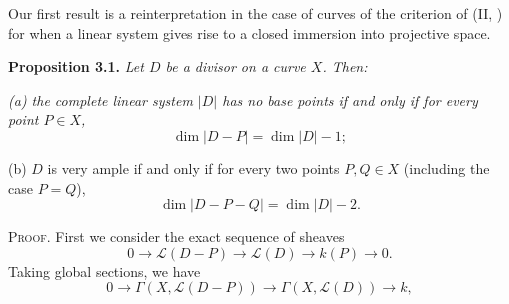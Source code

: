 {Our first result is a reinterpretation in the case of curves of the criterion of (II, ) for when a linear system gives rise to a closed immersion into projective space.

\medskip
\noindent\hypertarget{result-IV-3.1}{}\textbf{Proposition 3.1.} \emph{Let $D$ be a divisor on a curve $X$. Then:}
\par{\itshape\leftskip=12pt
\hypertarget{result-IV-3.1a}{}(a) the complete linear system $|D|$ has no base points if and only if for every point $P\in X$,
\[
\dim|D-P|=\dim|D|-1;
\]

\hypertarget{result-IV-3.1b}{}(b) $D$ is very ample if and only if for every two points $P,Q\in X$ (including the case $P=Q$),
\[
\dim|D-P-Q|=\dim|D|-2.
\]\par}

\smallskip
\noindent\textsc{Proof.} First we consider the exact sequence of sheaves
\[
0\to\mathcal L(D-P)\to\mathcal L(D)\to k(P)\to0.
\]
Taking global sections, we have
\[
0\to\Gamma(X,\mathcal L(D-P))\to\Gamma(X,\mathcal L(D))\to k,
\]
}
